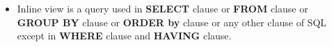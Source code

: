 \setlength{\columnsep}{3pt}
\begin{flushleft}
	
	\begin{itemize}
		\item Inline view is a query used in \textbf{SELECT} clause or \textbf{FROM} clause or \textbf{GROUP BY} clause or \textbf{ORDER by} clause or any other clause of SQL except in \textbf{WHERE} clause and \textbf{HAVING} clause.
		
		
	\end{itemize}
	
\end{flushleft}

\newpage

